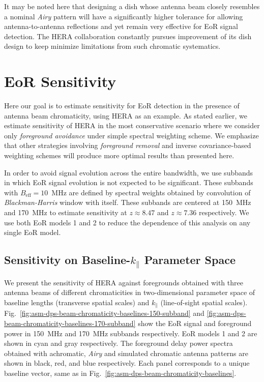 \documentclass[preprint2,iop,numberedappendix,twocolappendix,appendixfloats]{emulateapj}
\begin{document}
It may be noted here that designing a dish whose antenna beam closely resembles a nominal {\it Airy} pattern will have a significantly higher tolerance for allowing antenna-to-antenna reflections and yet remain very effective for EoR signal detection. The HERA collaboration constantly pursues improvement of its dish design to keep minimize limitations from such chromatic systematics.

\section{EoR Sensitivity}\label{sec:eor-sensitivity}

Here our goal is to estimate sensitivity for EoR detection in the presence of antenna beam chromaticity, using HERA as an example. As stated earlier, we estimate sensitivity of HERA in the most conservative scenario where we consider only {\it foreground avoidance} under simple spectral weighting scheme. We emphasize that other strategies involving {\it foreground removal} and inverse covariance-based weighting schemes will produce more optimal results than presented here. 

In order to avoid signal evolution across the entire bandwidth, we use subbands in which EoR signal evolution is not expected to be significant. These subbands with $B_\textrm{eff}=10$~MHz are defined by spectral weights obtained by convolution of {\it Blackman-Harris} window with itself. These subbands are centered at 150~MHz and 170~MHz to estimate sensitivity at $z \approx 8.47$ and $z \approx 7.36$ respectively. We use both EoR models 1 and 2 to reduce the dependence of this analysis on any single EoR model.

\subsection{Sensitivity on Baseline-$k_\parallel$ Parameter Space}\label{sec:baseline-kprll}

We present the sensitivity of HERA against foregrounds obtained with three antenna beams of different chromaticities in two-dimensional parameter space of baseline lengths (transverse spatial scales) and $k_\parallel$ (line-of-sight spatial scales). Fig.~\ref{fig:asm-dps-beam-chromaticity-baselines-150-subband} and \ref{fig:asm-dps-beam-chromaticity-baselines-170-subband} show the EoR signal and foreground power in 150~MHz and 170~MHz subbands respectively. EoR models 1 and 2 are shown in cyan and gray respectively. The foreground delay power spectra obtained with achromatic, {\it Airy} and simulated chromatic antenna patterns are shown in black, red, and blue respectively. Each panel corresponds to a unique baseline vector, same as in Fig.~\ref{fig:asm-dps-beam-chromaticity-baselines}. 
\end{document}
